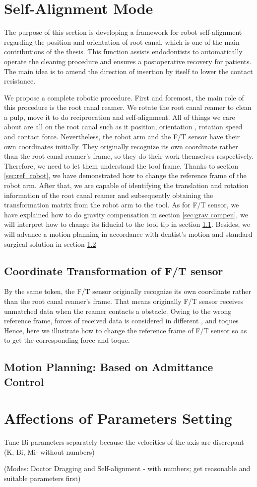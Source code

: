 \section{Self-Alignment Mode}
The purpose of this section is developing a framework for robot self-alignment regarding the position and orientation of root canal, which is one of the main contributions of the thesis. This function assists endodontists to automatically operate the cleaning procedure and ensures a postoperative recovery for patients. The main idea is to amend the direction of insertion by itself to lower the contact resistance.
\par
We propose a complete robotic procedure. First and foremost, the main role of this procedure is the root canal reamer. We rotate the root canal reamer to clean a pulp, move it to do reciprocation and self-alignment. All of things we care about are all on the root canal such as it position, orientation , rotation speed and contact force. Nevertheless, the robot arm and the F/T sensor have their own coordinates initially. They originally recognize its own coordinate rather than the root canal reamer's frame, so they do their work themselves respectively. Therefore, we need to let them understand the tool frame. Thanks to section \ref{sec:ref_robot}, we have demonstrated how to change the reference frame of the robot arm. After that, we are capable of identifying the translation and rotation information of the root canal reamer and subsequently obtaining the transformation matrix from the robot arm to the tool. As for F/T sensor, we have explained how to do gravity compensation in section \ref{sec:grav compen}, we will interpret how to change its fiducial to the tool tip in section \ref{sec:rfc}. Besides, we will advance a motion planning in accordance with dentist's motion and standard surgical solution in section \ref{sec:motion planning} 
\subsection{Coordinate Transformation of F/T sensor}
\label{sec:rfc}
By the same token, the F/T sensor originally recognize its own coordinate rather than the root canal reamer's frame. That means originally F/T sensor receives unmatched data when the reamer contacts a obstacle. Owing to the wrong reference frame, forces of received data is considered in different , and toques  Hence, here we illustrate how to change the reference frame of F/T sensor so as to get the corresponding force and toque.
\subsection{Motion Planning: Based on Admittance Control}
\label{sec:motion planning} 
\section{Affections of Parameters Setting}
\label{sec:affection}
Tune Bi parameters separately because the velocities of the axis are discrepant
(K, Bi, Mi- without numbers)
\par\noindent
(Modes: Doctor Dragging and Self-alignment - with numbers; get reasonable and suitable parameters first)